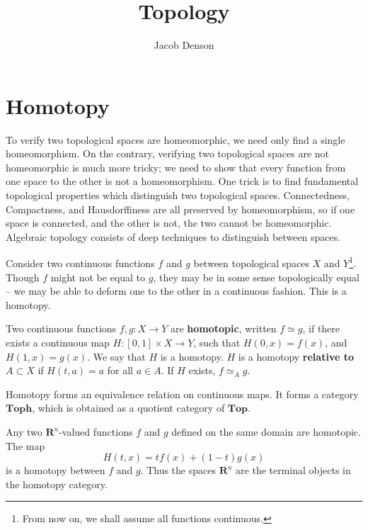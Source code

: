 

\DeclareMathOperator{\Dom}{Dom}

\title{Topology}
\author{Jacob Denson}




\maketitle

\tableofcontents


\chapter{Homotopy}

To verify two topological spaces are homeomorphic, we need only find a single homeomorphism. On the contrary, verifying two topological spaces are not homeomorphic is much more tricky; we need to show that every function from one space to the other is not a homeomorphism. One trick is to find fundamental topological properties which distinguish two topological spaces. Connectedness, Compactness, and Hausdorffiness are all preserved by homeomorphism, so if one space is connected, and the other is not, the two cannot be homeomorphic. Algebraic topology consists of deep techniques to distinguish between spaces.

Consider two continuous functions $f$ and $g$ between topological spaces $X$ and $Y$\footnote{From now on, we shall assume all functions continuous.}. Though $f$ might not be equal to $g$, they may be in some sense topologically equal -- we may be able to deform one to the other in a continuous fashion. This is a homotopy.

\begin{definition}
    Two continuous functions $f,g: X \to Y$ are {\bf homotopic}, written $f \simeq g$, if there exists a continuous map $H: [0,1] \times X \to Y$, such that $H(0,x) = f(x)$, and $H(1,x) = g(x)$. We say that $H$ is a homotopy. $H$ is a homotopy {\bf relative to} $A \subset X$ if $H(t,a) = a$ for all $a \in A$. If $H$ exists, $f \simeq_A g$.
\end{definition}

Homotopy forms an equivalence relation on continuous maps. It forms a category $\textbf{Toph}$, which is obtained as a quotient category of $\textbf{Top}$. 

\begin{example}
    Any two $\mathbf{R}^n$-valued functions $f$ and $g$ defined on the same domain are homotopic. The map
    \[ H(t,x) = t f(x) + (1 - t) g(x) \]
    is a homotopy between $f$ and $g$. Thus the spaces $\mathbf{R}^n$ are the terminal objects in the homotopy category.
\end{example}

